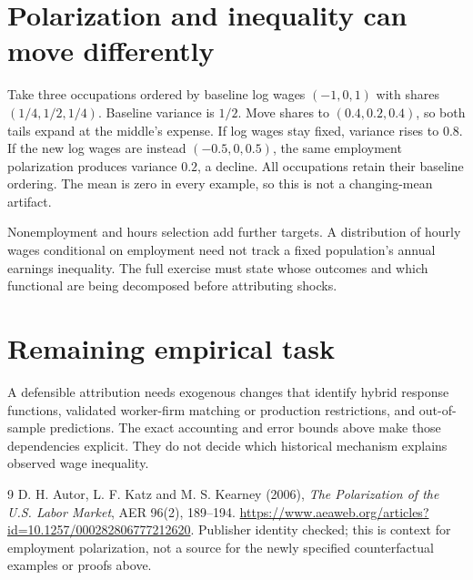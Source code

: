 \documentclass[11pt]{article}
\theoremstyle{definition}
\begin{document}
\section*{Polarization and inequality can move differently}
Take three occupations ordered by baseline log wages $(-1,0,1)$ with shares
$(1/4,1/2,1/4)$. Baseline variance is $1/2$. Move shares to $(0.4,0.2,0.4)$,
so both tails expand at the middle's expense. If log wages stay fixed, variance
rises to $0.8$. If the new log wages are instead $(-0.5,0,0.5)$, the same
employment polarization produces variance $0.2$, a decline. All occupations
retain their baseline ordering. The mean is zero in every example, so this is
not a changing-mean artifact.

Nonemployment and hours selection add further targets. A distribution of hourly
wages conditional on employment need not track a fixed population's annual
earnings inequality. The full exercise must state whose outcomes and which
functional are being decomposed before attributing shocks.

\section*{Remaining empirical task}
A defensible attribution needs exogenous changes that identify hybrid response
functions, validated worker-firm matching or production restrictions, and
out-of-sample predictions. The exact accounting and error bounds above make
those dependencies explicit. They do not decide which historical mechanism
explains observed wage inequality.
\begin{thebibliography}{9}
 D. H. Autor, L. F. Katz and M. S. Kearney (2006),
\emph{The Polarization of the U.S. Labor Market}, AER 96(2), 189--194.
\url{https://www.aeaweb.org/articles?id=10.1257/000282806777212620}.
Publisher identity checked; this is context for employment polarization,
not a source for the newly specified counterfactual examples or proofs above.
\end{thebibliography}
\end{document}
